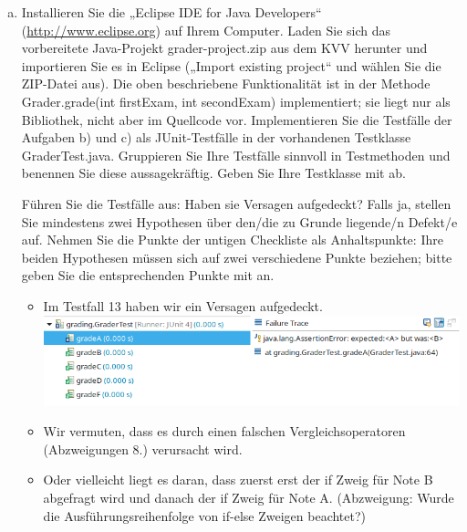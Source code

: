 \begin{enumerate}[c)]
    \item Installieren Sie die „Eclipse IDE for Java Developers“ (\url{http://www.eclipse.org}) auf Ihrem Computer. Laden Sie sich das vorbereitete Java-Projekt grader-project.zip aus dem KVV herunter und importieren Sie es in Eclipse („Import existing project“ und wählen Sie die ZIP-Datei aus). Die oben beschriebene Funktionalität ist in der Methode Grader.grade(int firstExam, int secondExam) implementiert; sie liegt nur als Bibliothek, nicht aber im Quellcode vor. Implementieren Sie die Testfälle der Aufgaben b) und c) als JUnit-Testfälle in der vorhandenen Testklasse GraderTest.java. Gruppieren Sie Ihre Testfälle sinnvoll in Testmethoden und benennen Sie diese aussagekräftig. Geben Sie Ihre Testklasse mit ab. 
    
    Führen Sie die Testfälle aus: Haben sie Versagen aufgedeckt? Falls ja, stellen Sie mindestens zwei Hypothesen über den/die zu Grunde liegende/n Defekt/e auf. Nehmen Sie die Punkte der untigen Checkliste als Anhaltspunkte: Ihre beiden Hypothesen müssen sich auf zwei verschiedene Punkte beziehen; bitte geben Sie die entsprechenden Punkte mit an.
    
    \begin{itemize}
        
        
        \item Im Testfall 13 haben wir ein Versagen aufgedeckt. 
        \\ \includegraphics[scale=0.8]{src/u11/output.png} \\
        
        \item Wir vermuten, dass es durch einen falschen Vergleichsoperatoren (Abzweigungen 8.) verursacht wird. 
        \item Oder vielleicht liegt es daran, dass zuerst erst der if Zweig für Note B abgefragt wird und danach der if Zweig für Note A. (Abzweigung: Wurde die Ausführungsreihenfolge von if-else Zweigen beachtet?)
    \end{itemize}
\end{enumerate}

